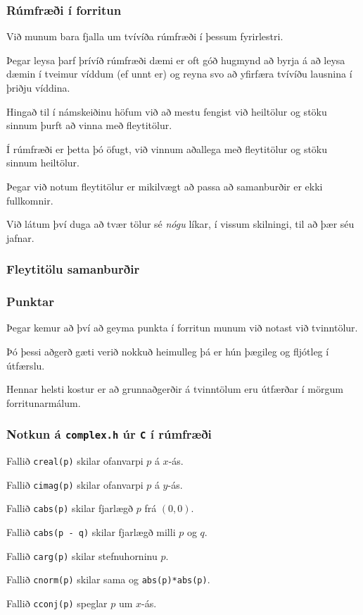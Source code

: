 {
	\frametitle{Rúmfræði í forritun}
	{
		\item<1-> Við munum bara fjalla um tvívíða rúmfræði í þessum fyrirlestri.
		\item<2-> Þegar leysa þarf þrívíð rúmfræði dæmi er oft góð hugmynd að byrja
			á að leysa dæmin í tveimur víddum (ef unnt er) og reyna svo að yfirfæra
			tvívíðu lausnina í þriðju víddina.  \item<3-> Hingað til í námskeiðinu höfum við að mestu fengist við heiltölur
			og stöku sinnum þurft að vinna með fleytitölur.
		\item<4-> Í rúmfræði er þetta þó öfugt, við vinnum aðallega með fleytitölur og stöku sinnum heiltölur.
		\item<5-> Þegar við notum fleytitölur er mikilvægt að passa að samanburðir er ekki fullkomnir.
		\item<6-> Við látum því duga að tvær tölur sé \emph{nógu} líkar, í vissum skilningi, til að þær séu jafnar.
	}
}

{
	\frametitle{Fleytitölu samanburðir}
}

{
	\frametitle{Punktar}
	{
		\item<1-> Þegar kemur að því að geyma punkta í forritun munum við notast við tvinntölur.
		\item<2-> Þó þessi aðgerð gæti verið nokkuð heimulleg þá er hún þægileg og fljótleg í útfærslu.
		\item<3-> Hennar helsti kostur er að grunnaðgerðir á tvinntölum eru útfærðar í mörgum forritunarmálum.
	}
}

{
	\frametitle{Notkun á \texttt{complex.h} úr \texttt{C} í rúmfræði}
	{
		\item<1-> Fallið \texttt{creal(p)} skilar ofanvarpi $p$ á $x$-ás.
		\item<2-> Fallið \texttt{cimag(p)} skilar ofanvarpi $p$ á $y$-ás.
		\item<3-> Fallið \texttt{cabs(p)} skilar fjarlægð $p$ frá $(0, 0)$.
		\item<4-> Fallið \texttt{cabs(p - q)} skilar fjarlægð milli $p$ og $q$.
		\item<5-> Fallið \texttt{carg(p)} skilar stefnuhorninu $p$.
		\item<6-> Fallið \texttt{cnorm(p)} skilar sama og \texttt{abs(p)*abs(p)}.
		\item<7-> Fallið \texttt{cconj(p)} speglar $p$ um $x$-ás.
	}
}

